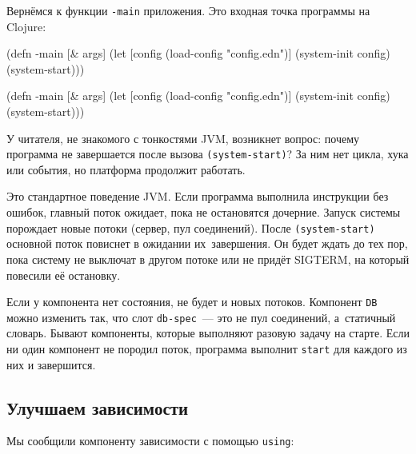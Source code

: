 
Вернёмся к функции \verb|-main| приложения. Это входная точка программы на
Clojure:

\ifx\DEVICETYPE\MOBILE

\begin{english}
  \begin{clojure}
(defn -main [& args]
  (let [config
        (load-config "config.edn")]
    (system-init config)
    (system-start)))
  \end{clojure}
\end{english}

\else

\begin{english}
  \begin{clojure}
(defn -main [& args]
  (let [config (load-config "config.edn")]
    (system-init config)
    (system-start)))
  \end{clojure}
\end{english}

\fi

У читателя, не знакомого с тонкостями JVM, возникнет вопрос: почему программа не
завершается после вызова \verb|(system-start)|? За ним нет цикла, хука или
события, но платформа продолжит работать.


Это стандартное поведение JVM. Если программа выполнила инструкции без ошибок,
главный поток ожидает, пока не остановятся дочерние. Запуск системы порождает
новые потоки (сервер, пул соединений). После \verb|(system-start)| основной
поток повиснет в ожидании их~завершения. Он будет ждать до тех пор, пока систему
не выключат в другом потоке или не придёт SIGTERM, на который повесили её
остановку.

Если у компонента нет состояния, не будет и новых потоков. Компонент \verb|DB|
можно изменить так, что слот \verb|db-spec|~--- это не пул соединений, а~статичный
словарь. Бывают компоненты, которые выполняют разовую задачу на старте. Если ни
один компонент не породил поток, программа выполнит \verb|start| для каждого из
них и завершится.

\subsection{Улучшаем зависимости}


Мы сообщили компоненту зависимости с помощью \verb|using|:

